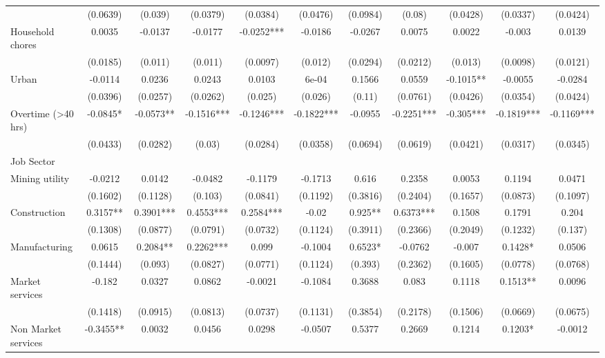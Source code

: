 \begin{table}[htbp]
{\begin{tabular}{lcccccccccc}
& (0.0639) & (0.039) & (0.0379) & (0.0384) & (0.0476) & (0.0984) & (0.08) & (0.0428) & (0.0337) & (0.0424) \\ 
Household chores & 0.0035 & -0.0137 & -0.0177 & -0.0252*** & -0.0186 & -0.0267 & 0.0075 & 0.0022 & -0.003 & 0.0139 \\
& (0.0185) & (0.011) & (0.011) & (0.0097) & (0.012) & (0.0294) & (0.0212) & (0.013) & (0.0098) & (0.0121) \\ 
Urban & -0.0114 & 0.0236 & 0.0243 & 0.0103 & 6e-04 & 0.1566 & 0.0559 & -0.1015** & -0.0055 & -0.0284 \\
& (0.0396) & (0.0257) & (0.0262) & (0.025) & (0.026) & (0.11) & (0.0761) & (0.0426) & (0.0354) & (0.0424) \\ 
Overtime (>40 hrs) & -0.0845* & -0.0573** & -0.1516*** & -0.1246*** & -0.1822*** & -0.0955 & -0.2251*** & -0.305*** & -0.1819*** & -0.1169*** \\
& (0.0433) & (0.0282) & (0.03) & (0.0284) & (0.0358) & (0.0694) & (0.0619) & (0.0421) & (0.0317) & (0.0345) \\ 
Job Sector &&&&&&&&&&\\
\hspace{1em}Mining utility & -0.0212 & 0.0142 & -0.0482 & -0.1179 & -0.1713 & 0.616 & 0.2358 & 0.0053 & 0.1194 & 0.0471 \\
& (0.1602) & (0.1128) & (0.103) & (0.0841) & (0.1192) & (0.3816) & (0.2404) & (0.1657) & (0.0873) & (0.1097) \\ 
\hspace{1em}Construction & 0.3157** & 0.3901*** & 0.4553*** & 0.2584*** & -0.02 & 0.925** & 0.6373*** & 0.1508 & 0.1791 & 0.204 \\
& (0.1308) & (0.0877) & (0.0791) & (0.0732) & (0.1124) & (0.3911) & (0.2366) & (0.2049) & (0.1232) & (0.137) \\ 
\hspace{1em}Manufacturing & 0.0615 & 0.2084** & 0.2262*** & 0.099 & -0.1004 & 0.6523* & -0.0762 & -0.007 & 0.1428* & 0.0506 \\
& (0.1444) & (0.093) & (0.0827) & (0.0771) & (0.1124) & (0.393) & (0.2362) & (0.1605) & (0.0778) & (0.0768) \\ 
\hspace{1em}Market services & -0.182 & 0.0327 & 0.0862 & -0.0021 & -0.1084 & 0.3688 & 0.083 & 0.1118 & 0.1513** & 0.0096 \\
& (0.1418) & (0.0915) & (0.0813) & (0.0737) & (0.1131) & (0.3854) & (0.2178) & (0.1506) & (0.0669) & (0.0675) \\ 
\hspace{1em}Non Market services & -0.3455** & 0.0032 & 0.0456 & 0.0298 & -0.0507 & 0.5377 & 0.2669 & 0.1214 & 0.1203* & -0.0012 \\

\end{tabular}}
\end{table}
